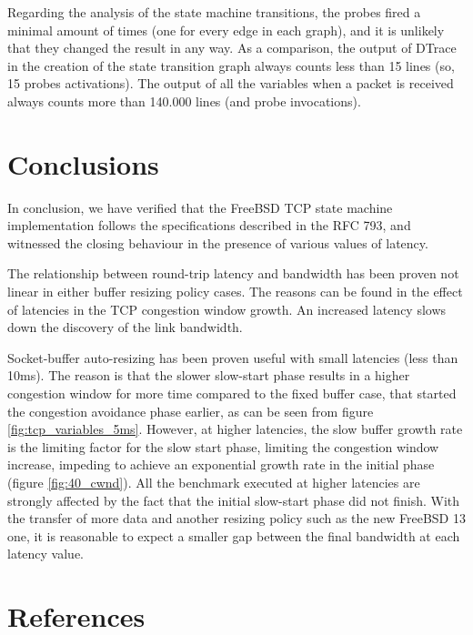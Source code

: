 \documentclass[a4paper,10pt]{article}
\begin{document}
Regarding the analysis of the state machine transitions, the probes fired a minimal amount of times (one for every edge in each graph), and it is unlikely that they changed the result in any way. As a comparison, the output of DTrace in the creation of the state transition graph always counts less than 15 lines (so, 15 probes activations). The output of all the variables when a packet is received always counts more than 140.000 lines (and probe invocations).


\section{Conclusions}

In conclusion, we have verified that the FreeBSD TCP state machine implementation follows the specifications described in the RFC 793\cite{RFC793}, and witnessed the closing behaviour in the presence of various values of latency.

The relationship between round-trip latency and bandwidth has been proven not linear in either buffer resizing policy cases. The reasons can be found in the effect of latencies in the TCP congestion window growth. An increased latency slows down the discovery of the link bandwidth. 

Socket-buffer auto-resizing has been proven useful with small latencies (less than 10ms). The reason is that the slower slow-start phase results in a higher congestion window for more time compared to the fixed buffer case, that started the congestion avoidance phase earlier, as can be seen from figure \ref{fig:tcp_variables_5ms}.
However,  at higher latencies, the slow buffer growth rate is the limiting factor for the slow start phase, limiting the congestion window increase, impeding to achieve an exponential growth rate in the initial phase (figure \ref{fig:40_cwnd}).  
All the benchmark executed at higher latencies are strongly affected by the fact that the initial slow-start phase did not finish. With the transfer of more data and another resizing policy such as the new FreeBSD 13 one, it is reasonable to expect a smaller gap between the final bandwidth at each latency value.

\newpage

\section{References}

\printbibliography

\end{document}
